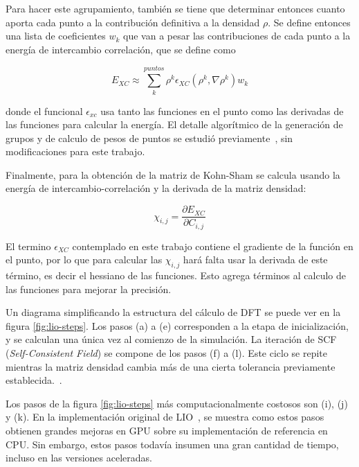 Para hacer este agrupamiento, tambi\'en se tiene que determinar entonces cuanto aporta cada punto a la contribuci\'on definitiva
a la densidad $\rho$. Se define entonces una lista de coeficientes $w_k$ que van a pesar las contribuciones de cada punto
a la energ\'ia de intercambio correlaci\'on, que se define como

\begin{equation}
  E_{XC} \approx \sum^{puntos}_k \rho^k \epsilon_{XC} (\rho^k,\nabla \rho^k) w_k
\end{equation}

donde el funcional $\epsilon_{xc}$ usa tanto las funciones en el punto como las derivadas de las funciones para
calcular la energ\'ia. El detalle algor\'itmico de la generaci\'on de grupos y de calculo de pesos de puntos
se estudi\'o previamente~\cite{Nitsche2014,TesisNitsche}, sin modificaciones para este trabajo.

Finalmente, para la obtenci\'on de la matriz de Kohn-Sham se calcula usando la energ\'ia de intercambio-correlaci\'on
y la derivada de la matriz densidad:

\begin{equation}
  \chi_{i,j} = \frac{\partial E_{XC}}{\partial C_{i,j}}
\end{equation}

El termino $\epsilon_{XC}$ contemplado en este trabajo contiene el gradiente de la funci\'on
en el punto, por lo que para calcular las $\chi_{i,j}$ har\'a falta usar la derivada de este
t\'ermino, es decir el hessiano de las funciones. Esto agrega t\'erminos al calculo de
las funciones para mejorar la precisi\'on.

Un diagrama simplificando la estructura del c\'alculo de DFT se puede ver en la figura \ref{fig:lio-steps}.
Los pasos (a) a (e) corresponden a la etapa de inicializaci\'on, y se calculan una \'unica vez
al comienzo de la simulaci\'on. La iteraci\'on de SCF (\textit{Self-Consistent Field}) se
compone de los pasos (f) a (l). Este ciclo se repite mientras la matriz densidad cambia
m\'as de una cierta tolerancia previamente establecida.~\cite{Nitsche2014}.

Los pasos de la figura \ref{fig:lio-steps} m\'as computacionalmente costosos son (i), (j) y (k).
En la implementaci\'on original de LIO~\cite{TesisNitsche}, se muestra como estos pasos
obtienen grandes mejoras en GPU sobre su implementaci\'on de referencia en CPU. Sin embargo,
estos pasos todav\'ia insumen una gran cantidad de tiempo, incluso en las versiones aceleradas.

